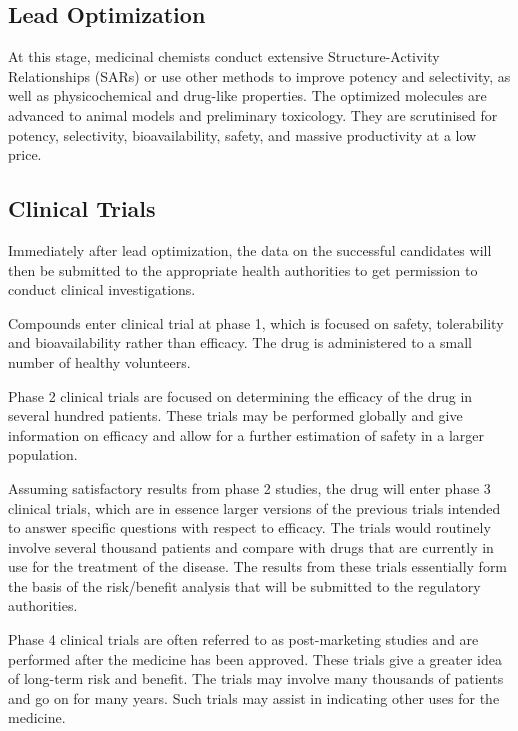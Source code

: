 \subsection{Lead Optimization}

At this stage, medicinal chemists conduct extensive Structure-Activity Relationships (SARs) \citep{328-2010} or use other methods \citep{661-2010,475-2011} to improve potency and selectivity, as well as physicochemical and drug-like properties. The optimized molecules are advanced to animal models and preliminary toxicology. They are scrutinised for potency, selectivity, bioavailability, safety, and massive productivity at a low price.

\subsection{Clinical Trials}

Immediately after lead optimization, the data on the successful candidates will then be submitted to the appropriate health authorities to get permission to conduct clinical investigations.

Compounds enter clinical trial at phase 1, which is focused on safety, tolerability and bioavailability rather than efficacy. The drug is administered to a small number of healthy volunteers.

Phase 2 clinical trials are focused on determining the efficacy of the drug in several hundred patients. These trials may be performed globally and give information on efficacy and allow for a further estimation of safety in a larger population.

Assuming satisfactory results from phase 2 studies, the drug will enter phase 3 clinical trials, which are in essence larger versions of the previous trials intended to answer specific questions with respect to efficacy. The trials would routinely involve several thousand patients and compare with drugs that are currently in use for the treatment of the disease. The results from these trials essentially form the basis of the risk/benefit analysis that will be submitted to the regulatory authorities.

Phase 4 clinical trials are often referred to as post-marketing studies and are performed after the medicine has been approved. These trials give a greater idea of long-term risk and benefit. The trials may involve many thousands of patients and go on for many years. Such trials may assist in indicating other uses for the medicine.

